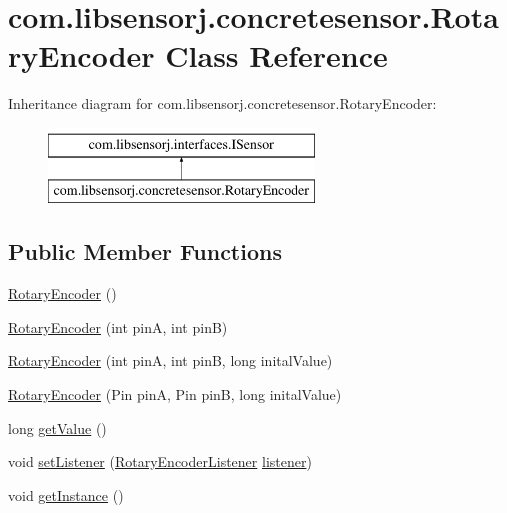\hypertarget{classcom_1_1libsensorj_1_1concretesensor_1_1RotaryEncoder}{}\section{com.\+libsensorj.\+concretesensor.\+Rotary\+Encoder Class Reference}
\label{classcom_1_1libsensorj_1_1concretesensor_1_1RotaryEncoder}
Inheritance diagram for com.\+libsensorj.\+concretesensor.\+Rotary\+Encoder\+:\begin{figure}[H]
\begin{center}
\leavevmode
\includegraphics[height=2.000000cm]{classcom_1_1libsensorj_1_1concretesensor_1_1RotaryEncoder}
\end{center}
\end{figure}
\subsection*{Public Member Functions}
\begin{DoxyCompactItemize}
\item 
\hyperlink{classcom_1_1libsensorj_1_1concretesensor_1_1RotaryEncoder_af6db9e02c77d1fe91adbd15162f18c76}{Rotary\+Encoder} ()
\item 
\hyperlink{classcom_1_1libsensorj_1_1concretesensor_1_1RotaryEncoder_a452c852313bec6067e0c564d454e1d2e}{Rotary\+Encoder} (int pin\+A, int pin\+B)
\item 
\hyperlink{classcom_1_1libsensorj_1_1concretesensor_1_1RotaryEncoder_ac3ed9b272a348582d4cb8a25eb49eead}{Rotary\+Encoder} (int pin\+A, int pin\+B, long inital\+Value)
\item 
\hyperlink{classcom_1_1libsensorj_1_1concretesensor_1_1RotaryEncoder_a4590e282d301bc7f6153f47a99ac0a50}{Rotary\+Encoder} (Pin pin\+A, Pin pin\+B, long inital\+Value)
\item 
long \hyperlink{classcom_1_1libsensorj_1_1concretesensor_1_1RotaryEncoder_a8a8c21decdf205abdd445c5f0c8742e4}{get\+Value} ()
\item 
void \hyperlink{classcom_1_1libsensorj_1_1concretesensor_1_1RotaryEncoder_ac8e16c6feadaac8fb338250d86842993}{set\+Listener} (\hyperlink{interfacecom_1_1libsensorj_1_1listeners_1_1RotaryEncoderListener}{Rotary\+Encoder\+Listener} \hyperlink{classcom_1_1libsensorj_1_1concretesensor_1_1RotaryEncoder_ae96674e284081057117e66d9bf2940ea}{listener})
\item 
void \hyperlink{classcom_1_1libsensorj_1_1concretesensor_1_1RotaryEncoder_aa0e07b8e5979b940a4a8bcb96d3af51e}{get\+Instance} ()
\end{DoxyCompactItemize}
